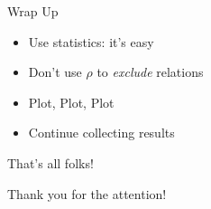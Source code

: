 \documentclass{beamer}[10]
\begin{document}
\begin{pyframe}{Wrap Up}
\begin{itemize}
\item Use statistics: it's easy
\item Don't use $\rho$ to \emph{exclude} relations
\item Plot, Plot, Plot
\item Continue collecting results
\end{itemize}
\end{pyframe}


\iffalse
\begin{pyframe}{mysqlbackup \-\-what}
To make a consistent backup you need to know
 how your data are stored (engine, ...).
 Are you sure your backup is:
\begin{itemize}
\item consistent?
\item usable?
\item without side effect?
\end{itemize}
Curious? Attend `MySQL for Pythonistas' on FIXME
\end{pyframe}
\fi


\begin{pyframe}{That's all folks!}
\begin{center}
Thank you for the attention! \\\\
\insertauthor
\end{center}
\end{pyframe}
\end{document}
